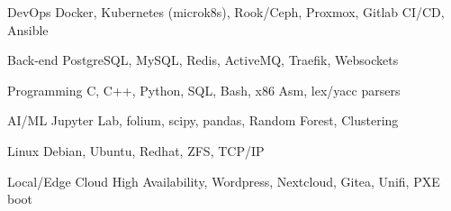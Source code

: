 
\begin{cvskills}


  \cvskill
    {DevOps} %
    {Docker, Kubernetes (microk8s), Rook/Ceph, Proxmox, Gitlab CI/CD, Ansible} %

  \cvskill
    {Back-end} %
    {PostgreSQL, MySQL, Redis, ActiveMQ, Traefik, Websockets} %


  \cvskill
    {Programming} %
    {C, C++, Python, SQL, Bash, x86 Asm, lex/yacc parsers} %

  \cvskill
    {AI/ML} %
    {Jupyter Lab, folium, scipy, pandas, Random Forest, Clustering} %


  \cvskill
    {Linux} %
    {Debian, Ubuntu, Redhat, ZFS, TCP/IP} %

  \cvskill
    {Local/Edge Cloud} %
    {High Availability, Wordpress, Nextcloud, Gitea, Unifi, PXE boot} %

\end{cvskills}
